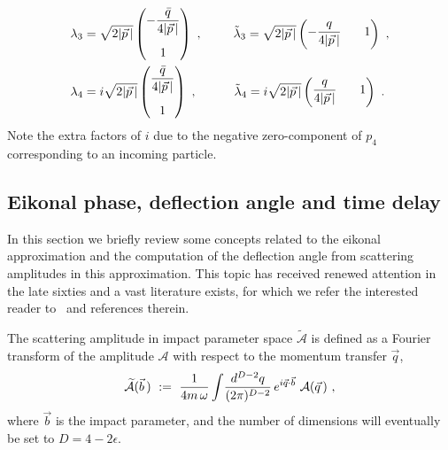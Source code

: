 \documentclass[a4paper,11pt]{article}
\numberwithin{equation}{section}
\newcommand{\cA}{\mathcal{A}}
\def\cA{\mathcal{A}}
\begin{document}
\begin{align}
\begin{split}
\lambda_3 &= \sqrt{ 2  |\vec{p}\, |} 
\begin{pmatrix} 
 - \dfrac{\bar{q}}{ 4   |\vec{p}\, |}
\vspace{0.3cm} \\ 
1
\end{pmatrix} \ , \qquad 
\ \, \tilde{\lambda}_3 = \sqrt{ 2  |\vec{p}\, |} 
\begin{pmatrix} 
 - \dfrac{{q}}{ 4   |\vec{p}\, |} & 
\hspace{0.3cm}  
1
\end{pmatrix} \ , 
\\
\lambda_4 &=i \sqrt{ 2  |\vec{p}\, |} 
\begin{pmatrix} 
  \dfrac{\bar{q}}{ 4   |\vec{p}\, |}
\vspace{0.3cm} \\ 
1
\end{pmatrix} \ , \qquad \quad
\tilde{\lambda}_4 = i\sqrt{ 2  |\vec{p}\, |} 
\begin{pmatrix} 
  \dfrac{{q}}{ 4   |\vec{p}\, |} & 
\hspace{0.3cm}  
1
\end{pmatrix} \ .
\end{split}
\end{align}
Note the extra factors of $i$ due to the negative zero-component of $p_4$ corresponding to an incoming particle.

\subsection{Eikonal phase, deflection angle and time delay}

In this section we briefly review some concepts related to the eikonal approximation and the computation  of the deflection angle from scattering amplitudes in this approximation. This topic has received renewed attention in the late sixties and a vast  literature exists, for which we refer the interested reader to~\cite{DiVecchia:2019myk,DiVecchia:2019kta,KoemansCollado:2019ggb} and references therein.

The scattering amplitude in impact parameter space $\widetilde{\cA}$ is defined as a  Fourier transform of the amplitude $\mathcal{A}$ with respect to the  momentum transfer  $\vec{q}$, 
\begin{align}
\label{amptraimp}
\widetilde{\cA} (\vec{b}\,) \ := \ {1\over 4 m \,\omega} \int\!{d^{D-2} q\over (2 \pi)^{D-2}} \, e^{i \vec{q} \cdot \vec{b}} \ \cA (\vec{q}\,)\ , 
\end{align}
where $\vec{b}$ is the impact parameter, and the number of dimensions will eventually be set  to $D=4-2\epsilon$.
\end{document}
